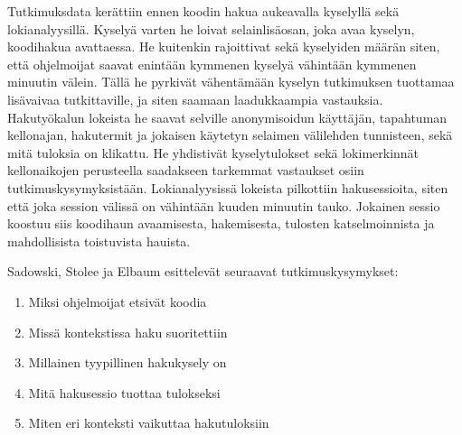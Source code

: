 \documentclass[finnish]{../tktltiki2}
\theoremstyle{definition}
\theoremstyle{remark}
\begin{document}
Tutkimuksdata kerättiin ennen koodin hakua aukeavalla kyselyllä sekä lokianalyysillä. Kyselyä varten he loivat selainlisäosan, joka avaa kyselyn, koodihakua avattaessa. He kuitenkin rajoittivat sekä kyselyiden määrän siten, että ohjelmoijat saavat enintään kymmenen kyselyä vähintään kymmenen minuutin välein. Tällä he pyrkivät vähentämään kyselyn tutkimuksen tuottamaa lisävaivaa tutkittaville, ja siten saamaan laadukkaampia vastauksia.  Hakutyökalun lokeista he saavat selville anonymisoidun käyttäjän, tapahtuman kellonajan, hakutermit ja jokaisen käytetyn selaimen välilehden tunnisteen, sekä mitä tuloksia on klikattu. He yhdistivät kyselytulokset sekä lokimerkinnät kellonaikojen perusteella saadakseen tarkemmat vastaukset osiin tutkimuskysymyksistään. Lokianalyysissä lokeista pilkottiin hakusessioita, siten että joka session välissä on vähintään kuuden minuutin tauko. Jokainen sessio koostuu siis koodihaun avaamisesta, hakemisesta, tulosten katselmoinnista ja mahdollisista toistuvista hauista.

Sadowski, Stolee ja Elbaum esittelevät seuraavat tutkimuskysymykset:

\begin{enumerate}
  \item Miksi ohjelmoijat etsivät koodia
  \item Missä kontekstissa haku suoritettiin
  \item Millainen tyypillinen hakukysely on
  \item Mitä hakusessio tuottaa tulokseksi
  \item Miten eri konteksti vaikuttaa hakutuloksiin
\end{enumerate}
\end{document}
